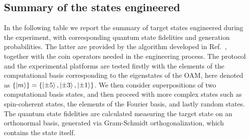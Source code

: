 \subsection{Summary of the states engineered}
In the following table we report the summary of target states engineered during the experiment, with corresponding quantum state fidelities and generation probabilities. The latter are provided by the algorithm developed in Ref.~\cite{innocenti2017quantum}, together with the coin operators needed in the engineering process.
The protocol and the experimental platforms are tested firstly with the elements of the computational basis corresponding to the eigenstates of the OAM, here denoted as $\{\ket{m} \}=\{\ket{\pm5}, \ket{\pm3},\ket{\pm1} \}$. We then consider superpositions of two computational basis states, and then proceed with more complex states such as spin-coherent states, the elements of the Fourier basis, and lastly random states. The quantum state fidelities are calculated measuring the target state on an orthonormal basis, generated via Gram-Schmidt orthogonalization, which contains the state itself.

